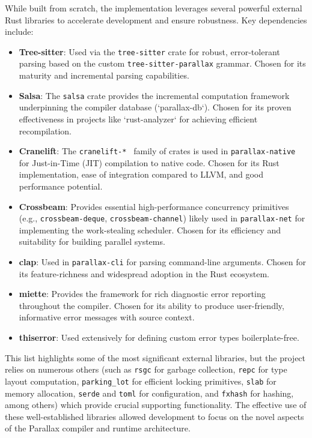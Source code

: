 While built from scratch, the implementation leverages several powerful external Rust libraries to accelerate development and ensure robustness. Key dependencies include:
\begin{itemize}
    \item \textbf{Tree-sitter}: Used via the \texttt{tree-sitter} crate for robust, error-tolerant parsing based on the custom \texttt{tree-sitter-parallax} grammar. Chosen for its maturity and incremental parsing capabilities.
    \item \textbf{Salsa}: The \texttt{salsa} crate provides the incremental computation framework underpinning the compiler database (`parallax-db`). Chosen for its proven effectiveness in projects like `rust-analyzer` for achieving efficient recompilation.
    \item \textbf{Cranelift}: The \texttt{cranelift-* } family of crates is used in \texttt{parallax-native} for Just-in-Time (JIT) compilation to native code. Chosen for its Rust implementation, ease of integration compared to LLVM, and good performance potential.
    \item \textbf{Crossbeam}: Provides essential high-performance concurrency primitives (e.g., \texttt{crossbeam-deque}, \texttt{crossbeam-channel}) likely used in \texttt{parallax-net} for implementing the work-stealing scheduler. Chosen for its efficiency and suitability for building parallel systems.
    \item \textbf{clap}: Used in \texttt{parallax-cli} for parsing command-line arguments. Chosen for its feature-richness and widespread adoption in the Rust ecosystem.
    \item \textbf{miette}: Provides the framework for rich diagnostic error reporting throughout the compiler. Chosen for its ability to produce user-friendly, informative error messages with source context.
    \item \textbf{thiserror}: Used extensively for defining custom error types boilerplate-free.
\end{itemize}
This list highlights some of the most significant external libraries, but the project relies on numerous others (such as \texttt{rsgc} for garbage collection, \texttt{repc} for type layout computation, \texttt{parking\_lot} for efficient locking primitives, \texttt{slab} for memory allocation, \texttt{serde} and \texttt{toml} for configuration, and \texttt{fxhash} for hashing, among others) which provide crucial supporting functionality. The effective use of these well-established libraries allowed development to focus on the novel aspects of the Parallax compiler and runtime architecture.

